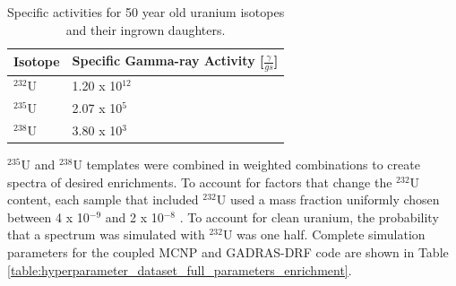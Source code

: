 \begin{table}[H]
\centering
\caption{Specific activities for 50 year old uranium isotopes and their ingrown daughters.}
\label{table:specific_activities_radsrc}
\begin{tabular}{ll}
\hline
\textbf{Isotope} & \textbf{Specific Gamma-ray Activity [$\frac{\gamma}{g s}$]} \\ \hline
$^{232}$U & 1.20 x 10$^{12}$ \\ 
$^{235}$U & 2.07 x 10$^{5}$ \\
$^{238}$U & 3.80 x 10$^{3}$ \\ \hline
\end{tabular}
\end{table}



$^{235}$U and $^{238}$U templates were combined in weighted combinations to create spectra of desired enrichments. To account for factors that change the $^{232}$U content, each sample that included $^{232}$U used a mass fraction uniformly chosen between 4 x 10$^{-9}$ and 2 x 10$^{-8}$ \cite{Peurrung2019}. To account for clean uranium, the probability that a spectrum was simulated with $^{232}$U was one half. Complete simulation parameters for the coupled MCNP and GADRAS-DRF code are shown in Table \ref{table:hyperparameter_dataset_full_parameters_enrichment}.

